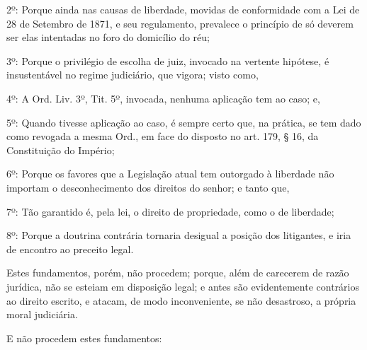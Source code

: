 2º: Porque ainda nas causas de liberdade, movidas de conformidade com a
Lei de 28 de Setembro de 1871, e seu regulamento, prevalece o princípio
de só deverem ser elas intentadas no foro do domicílio do réu;

3º: Porque o privilégio de escolha de juiz, invocado na vertente
hipótese, é insustentável no regime judiciário, que vigora; visto como,

4º: A Ord. Liv. 3º, Tit. 5º, invocada, nenhuma aplicação tem ao caso; e,

5º: Quando tivesse aplicação ao caso, é sempre certo que, na prática, se
tem dado como revogada a mesma Ord., em face do disposto no art. 179, §
16, da Constituição do Império;

6º: Porque os favores que a Legislação atual tem outorgado à liberdade
não importam o desconhecimento dos direitos do senhor; e tanto que,

7º: Tão garantido é, pela lei, o direito de propriedade, como o de
liberdade;

8º: Porque a doutrina contrária tornaria desigual a posição dos
litigantes, e iria de encontro ao preceito legal.

Estes fundamentos, porém, não procedem; porque, além de carecerem de
razão jurídica, não se esteiam em disposição legal; e antes são
evidentemente contrários ao direito escrito, e atacam, de modo
inconveniente, se não desastroso, a própria moral judiciária.

E não procedem estes fundamentos:

